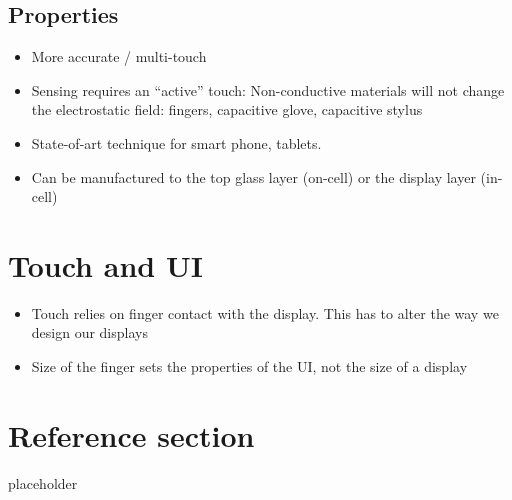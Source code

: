 \documentclass{article}
\begin{document}
\subsection{Properties}
\begin{itemize}
  \item More accurate / multi-touch
  \item Sensing requires an “active” touch: Non-conductive materials will not change the electrostatic field: fingers, capacitive glove, capacitive stylus
  \item State-of-art technique for smart phone, tablets.
  \item Can be manufactured to the top glass layer (on-cell) or the display layer (in-cell)
\end{itemize}

\section{Touch and UI}

\begin{itemize}
  \item Touch relies on finger contact with the display. This has to alter the way we design our displays
  \item Size of the finger sets the properties of the UI, not the size of a display
\end{itemize}

\pagebreak
\section*{Reference section} \label{sec:reference}
\begin{description}
	\item[placeholder] \hfill \\
\end{description}
\end{document}
